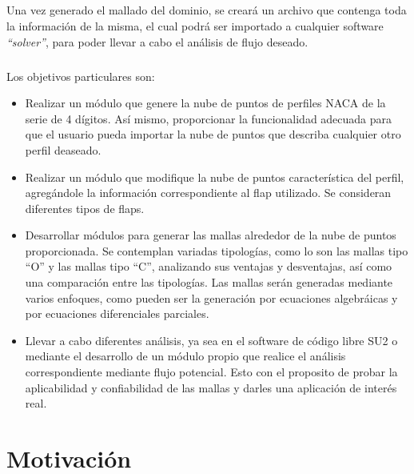 \documentclass[letterpaper, openright, 12pt]{book}
\begin{document}
    \paragraph*{}
    Una vez generado el mallado del dominio, se creará un archivo que
    contenga toda la información de la misma, el cual podrá ser importado a
    cualquier software \textit{``solver''}, para poder llevar a cabo el
    análisis de flujo deseado.

    \paragraph*{}
    Los objetivos particulares son:
        \begin{itemize}
            \item{Realizar un módulo que genere la nube de puntos de perfiles
                NACA de la serie de 4 dígitos. Así mismo, proporcionar la
                funcionalidad adecuada para que el usuario pueda importar la
                nube de puntos que describa cualquier otro perfil deaseado.}
            \item{Realizar un módulo que modifique la nube de puntos
                característica del perfil, agregándole la información
                correspondiente al flap utilizado. Se consideran
                diferentes tipos de flaps.}
            \item{Desarrollar módulos para generar las mallas alrededor de la
                nube de puntos proporcionada. Se contemplan variadas tipologías,
                como lo son las mallas tipo “O” y las mallas tipo “C”,
                analizando sus ventajas y desventajas, así como una comparación
                entre las tipologías. Las mallas serán generadas mediante varios
                enfoques, como pueden ser la generación por ecuaciones
                algebráicas y por ecuaciones diferenciales parciales.}
            \item{Llevar a cabo diferentes análisis, ya sea en el software de
                código libre SU2 o mediante el desarrollo de un módulo propio
                que realice el análisis correspondiente mediante flujo 
                potencial. Esto con el proposito de probar la aplicabilidad y
                confiabilidad de las mallas y darles una aplicación de interés
                real.}
        \end{itemize}




    \chapter*{Motivación}
\end{document}
